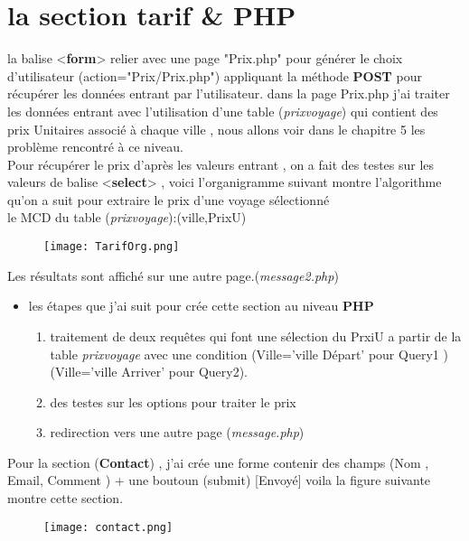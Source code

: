 \documentclass[a4paper,12pt]{report}
\begin{document}
\section*{la section tarif \& \textbf{PHP}}
\begin{tcolorbox}
la balise <\textbf{form}> relier avec une page "Prix.php" pour générer le choix d'utilisateur (action="Prix/Prix.php") appliquant la méthode \textbf{POST} pour récupérer les données entrant par l'utilisateur.
dans la page Prix.php j'ai traiter les données entrant avec l'utilisation d'une table (\textit{prixvoyage}) qui contient des prix Unitaires associé à chaque ville , nous allons voir dans le chapitre 5 les problème rencontré à ce niveau.\\
Pour récupérer le prix d'après les valeurs entrant , on a fait des testes sur les valeurs de balise <\textbf{select}> , voici l'organigramme suivant montre l'algorithme qu'on a suit pour extraire le prix d'une voyage sélectionné \\
le MCD du table (\textit{prixvoyage}):(ville,PrixU)
\end{tcolorbox}
\begin{figure}[H]
\begin{center}
\centering
\texttt{[image: TarifOrg.png]}
\end{center}
\label{tarifOrg}
\end{figure}
Les résultats sont affiché sur une autre page.(\textit{message2.php})
\begin{itemize}
\item les étapes que j'ai suit pour crée cette section au niveau \textbf{PHP}
\begin{enumerate}
\item traitement de deux requêtes qui font une sélection du PrxiU a partir de la table \textit{prixvoyage} avec une condition (Ville='ville Départ' pour Query1 )(Ville='ville Arriver' pour Query2).
\item des testes sur les options pour traiter le prix
\item redirection vers une autre page (\textit{message.php})
\end{enumerate}
\end{itemize}
Pour la section (\textbf{Contact}) , j'ai crée une forme contenir des champs (Nom , Email, Comment ) + une boutoun (submit) [Envoyé] voila la figure suivante montre cette section.
\begin{figure}[H]
\begin{center}
\centering
\texttt{[image: contact.png]}
\end{center}
\label{contact}
\end{figure}
\end{document}
